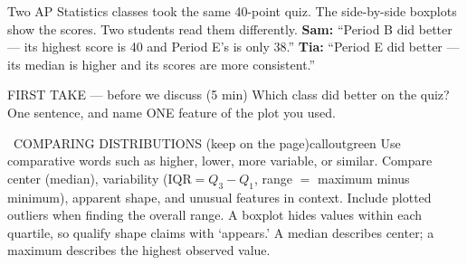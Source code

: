 \documentclass[11pt]{article}
\begin{document}


Two AP Statistics classes took the same 40-point quiz. The side-by-side boxplots show the scores. Two students read them differently. \textbf{Sam:} ``Period B did better --- its highest score is 40 and Period E's is only 38.'' \textbf{Tia:} ``Period E did better --- its median is higher and its scores are more consistent.''\par
\begin{center}
\end{center}
\begin{firsttakebox}{FIRST TAKE --- before we discuss (5 min)}
Which class did better on the quiz? One sentence, and name ONE feature of the plot you used.
\workspace{0.9in}
\end{firsttakebox}

\begin{callout}{\IconBook\ COMPARING DISTRIBUTIONS (keep on the page)}{calloutgreen}
Use comparative words such as higher, lower, more variable, or similar. Compare center (median), variability ($\mathrm{IQR}=Q_3-Q_1$, range $=$ maximum minus minimum), apparent shape, and unusual features in context. Include plotted outliers when finding the overall range. A boxplot hides values within each quartile, so qualify shape claims with `appears.' A median describes center; a maximum describes the highest observed value.
\end{callout}
\end{document}
